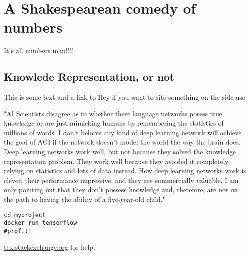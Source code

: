 \setchapterpreamble[u]{\margintoc}
\chapter{A Shakespearean comedy of numbers}

It's all numbers man!!!!

\section{Knowlede Representation, or not}

This is some text and a link to 
Hey if you want to site something on the side use

"AI Scientists disagree as to whether these language networks posess true knowledge or are just mimicking humans by remembering the statistics of millions of words. I don't beloive any kind of deep learning network will achieve the goal of AGI if the network doesn't model the world the way the brain does. Deep learning networks work well, but not because they solved the knowledge representation problem. They work well because they avoided it completely, relying on statistics and lots of data instead. How deep learning networks work is clever, their performance impressive, and they are commercially valuable. I am only pointing out that they don't possess knowledge and, therefore, are not on the path to having the ability of a five-year-old child." \cite{hawkins_2022}


\begin{lstlisting}[style=kaolstplain,linewidth=1.5\textwidth]
cd myproject
docker run tensorflow
#profit!
\end{lstlisting}

\url{tex.stackexchange.org} for help.
